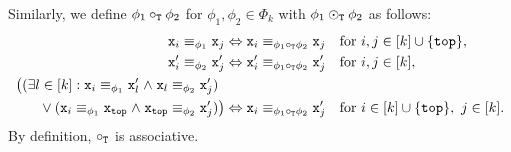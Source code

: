 Similarly, we define $\phi_1\circ_{\mathtt{T}}\phi_2$
for $\phi_1,\phi_2\in\Phi_k$ with $\phi_1\odot_{\mathtt{T}}\phi_2$
as follows: %
\begin{align*}
  {\tt x}_i \equiv_{\phi_1} {\tt x}_j &\Leftrightarrow
  {\tt x}_i \equiv_{\phi_1\circ_{\mathtt{T}}\phi_2} {\tt x}_j &&\text{for } i,j\in [k]\cup\{\mathtt{top}\},\\
  {\tt x}'_i \equiv_{\phi_2} {\tt x}'_j &\Leftrightarrow
  {\tt x}'_i \equiv_{\phi_1\circ_{\mathtt{T}}\phi_2} {\tt x}'_j &&\text{for } i,j\in [k],\\
  \bigl(
  (\exists l\in [k] : {\tt x}_i \equiv_{\phi_1} {\tt x}'_l \mathrel{\land}
  {\tt x}_l \equiv_{\phi_2} {\tt x}'_j) \hphantom{\bigr)} \\ {}\lor
  ({\tt x}_i\equiv_{\phi_1}{\tt x}_{\mathtt{top}} \mathrel{\land} {\tt x}_{\mathtt{top}}\equiv_{\phi_2}{\tt x}'_j)\bigr)
  &\Leftrightarrow
  {\tt x}_i \equiv_{\phi_1\circ_{\mathtt{T}}\phi_2} {\tt x}'_j
  &&\text{for } i\in[k]\cup\{\mathtt{top}\},\ j\in [k].
\end{align*}
%
By definition, $\circ_{\mathtt{T}}$ is associative.

\smallskip


